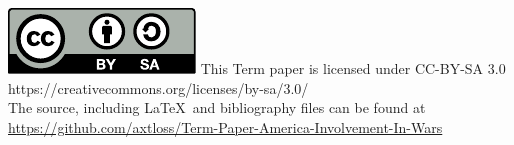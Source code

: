 \includegraphics{by-sa.pdf}
This Term paper is licensed under CC-BY-SA 3.0\\
https://creativecommons.org/licenses/by-sa/3.0/\\
The source, including \LaTeX\  and bibliography files can be found at\\ \url{https://github.com/axtloss/Term-Paper-America-Involvement-In-Wars}